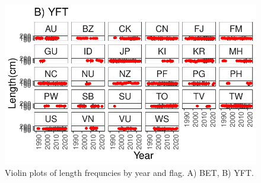 \documentclass[
  letterpaper,
  DIV=11,
  numbers=noendperiod]{scrartcl}
\begin{document}
\begin{figure}

{\centering \includegraphics{length_data_explore_files/figure-pdf/yr_flag_violin-3.pdf}

}

\caption{Violin plots of length frequncies by year and flag. A) BET, B)
YFT.}

\end{figure}
\end{document}
